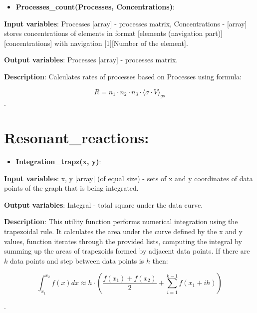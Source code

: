 \documentclass[a4paper,12pt]{article}
\newcommand{\namefunction}[4]{
  \begin{itemize}
    \item \textbf{#1}:
  \end{itemize}
  
  \textbf{Input variables}: #2.
  
  \textbf{Output variables}: #4.
  
  \textbf{Description}: #3.
}
\begin{document}
\namefunction{Processes\_count(Processes, Concentrations)}{Processes [array] - processes matrix, Concentrations - [array] stores concentrations of elements in format [elements (navigation part)][concentrations] with navigation [1][Number of the element]}{Calculates rates of processes based on Processes using formula:

\[R = n_1 \cdot n_2 \cdot n_3 \cdot \langle \sigma \cdot V \rangle_{gs}\]}{Processes [array] - processes matrix}

\section{Resonant\_reactions:}

\vspace{1em}

\namefunction{Integration\_trapz(x, y)}{x, y [array] (of equal size) - sets of x and y coordinates of data points of the graph that is being integrated}{This utility function performs numerical integration using the trapezoidal rule. It calculates the area under the curve defined by the x and y values, function iterates through the provided lists, computing the integral by summing up the areas of trapezoids formed by adjacent data points. If there are $k$ data points and step between data points is $h$ then:

\[\int_{x_1}^{x_2} f(x) dx \approx h \cdot \left( \frac{f(x_1) + f(x_2)}{2} + \sum_{i = 1}^{k - 1} f(x_1 + ih)\right)\]

}{Integral - total square under the data curve}

\vspace{1em}
\end{document}
